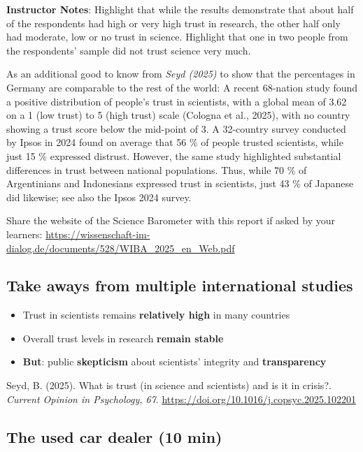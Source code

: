 \documentclass[
  letterpaper,
  DIV=11,
  numbers=noendperiod]{scrartcl}
\providecommand{\tightlist}{%
  \setlength{\itemsep}{0pt}\setlength{\parskip}{0pt}}
\begin{document}
\textbf{Instructor Notes}: Highlight that while the results demonstrate
that about half of the respondents had high or very high trust in
research, the other half only had moderate, low or no trust in science.
Highlight that one in two people from the respondents' sample did not
trust science very much.

As an additional good to know from \emph{Seyd (2025)} to show that the
percentages in Germany are comparable to the rest of the world: A recent
68-nation study found a positive distribution of people's trust in
scientists, with a global mean of 3.62 on a 1 (low trust) to 5 (high
trust) scale (Cologna et al., 2025), with no country showing a trust
score below the mid-point of 3. A 32-country survey conducted by Ipsos
in 2024 found on average that 56 \% of people trusted scientists, while
just 15 \% expressed distrust. However, the same study highlighted
substantial differences in trust between national populations. Thus,
while 70 \% of Argentinians and Indonesians expressed trust in
scientists, just 43 \% of Japanese did likewise; see also the Ipsos 2024
survey.

Share the website of the Science Barometer with this report if asked by
your learners:
\url{https://wissenschaft-im-dialog.de/documents/528/WIBA_2025_en_Web.pdf}

\subsection{Take aways from multiple international
studies}\label{take-aways-from-multiple-international-studies}

\begin{itemize}
\tightlist
\item
  Trust in scientists remains \textbf{relatively high} in many countries
\item
  Overall trust levels in research \textbf{remain stable}
\item
  \textbf{But}: public \textbf{skepticism} about scientists' integrity
  and \textbf{transparency}
\end{itemize}

Seyd, B. (2025). What is trust (in science and scientists) and is it in
crisis?. \emph{Current Opinion in Psychology, 67}.
\url{https://doi.org/10.1016/j.copsyc.2025.102201}

\subsection{\texorpdfstring{ The used car dealer
(10
min)}{ The used car dealer (10 min)}}\label{b58fc729-690b-4000-b19f-365a4093b2ff7b7b3c2066612070656f706c652d67726f75702073697a653d3178203e7d7d-the-used-car-dealer-10-min}
\end{document}

